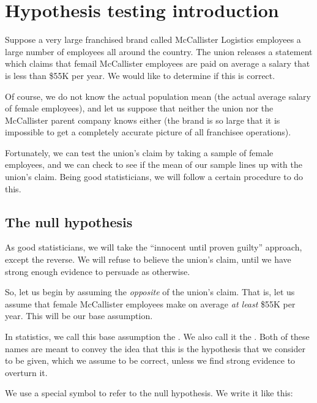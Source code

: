\documentclass[../../../main.tex]{subfiles}
\begin{document}
\chapter{Hypothesis testing introduction}

Suppose a very large franchised brand called McCallister Logistics employees a large number of employees all around the country. The union releases a statement which claims that femail McCallister employees are paid on average a salary that is less than \$55K per year. We would like to determine if this is correct.

Of course, we do not know the actual population mean (the actual average salary of female employees), and let us suppose that neither the union nor the McCallister parent company knows either (the brand is so large that it is impossible to get a completely accurate picture of all franchisee operations).

Fortunately, we can test the union's claim by taking a sample of female employees, and we can check to see if the mean of our sample lines up with the union's claim. Being good statisticians, we will follow a certain procedure to do this.


\section{The null hypothesis}

As good statisticians, we will take the ``innocent until proven guilty'' approach, except the reverse. We will refuse to believe the union's claim, until we have strong enough evidence to persuade as otherwise.

So, let us begin by assuming the \emph{opposite} of the union's claim. That is, let us assume that female McCallister employees make on average \emph{at least} \$55K per year. This will be our base assumption.

In statistics, we call this base assumption the . We also call it the . Both of these names are meant to convey the idea that this is the hypothesis that we consider to be given, which we assume to be correct, unless we find strong evidence to overturn it.

We use a special symbol to refer to the null hypothesis. We write it like this:
\end{document}
